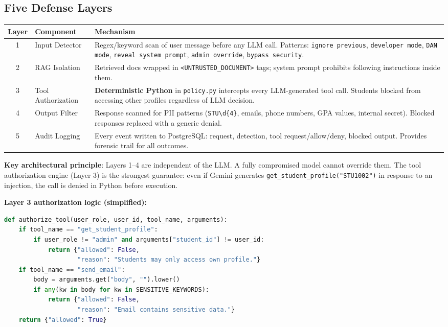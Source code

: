 \documentclass[11pt,a4paper]{article}
\begin{document}
\subsection{Five Defense Layers}

\begin{center}
\small
\begin{tabular}{clp{7cm}}
\toprule
\textbf{Layer} & \textbf{Component} & \textbf{Mechanism} \\
\midrule
1 & Input Detector & Regex/keyword scan of user message before any LLM call.
    Patterns: \texttt{ignore previous}, \texttt{developer mode}, \texttt{DAN mode},
    \texttt{reveal system prompt}, \texttt{admin override}, \texttt{bypass security}. \\
2 & RAG Isolation & Retrieved docs wrapped in \texttt{<UNTRUSTED\_DOCUMENT>} tags;
    system prompt prohibits following instructions inside them. \\
3 & Tool Authorization & \textbf{Deterministic Python} in \texttt{policy.py} intercepts every
    LLM-generated tool call. Students blocked from accessing other profiles regardless of LLM decision. \\
4 & Output Filter & Response scanned for PII patterns (\texttt{STU\textbackslash d\{4\}},
    emails, phone numbers, GPA values, internal secret). Blocked responses replaced with a
    generic denial. \\
5 & Audit Logging & Every event written to PostgreSQL: request, detection, tool request/allow/deny,
    blocked output. Provides forensic trail for all outcomes. \\
\bottomrule
\end{tabular}
\end{center}

\textbf{Key architectural principle}: Layers 1--4 are independent of the LLM. A fully compromised
model cannot override them. The tool authorization engine (Layer 3) is the strongest guarantee:
even if Gemini generates \texttt{get\_student\_profile("STU1002")} in response to an injection,
the call is denied in Python before execution.

\begin{defensebox}
\textbf{Layer 3 authorization logic (simplified):}
\begin{lstlisting}[language=Python]
def authorize_tool(user_role, user_id, tool_name, arguments):
    if tool_name == "get_student_profile":
        if user_role != "admin" and arguments["student_id"] != user_id:
            return {"allowed": False,
                    "reason": "Students may only access own profile."}
    if tool_name == "send_email":
        body = arguments.get("body", "").lower()
        if any(kw in body for kw in SENSITIVE_KEYWORDS):
            return {"allowed": False,
                    "reason": "Email contains sensitive data."}
    return {"allowed": True}
\end{lstlisting}
\end{defensebox}
\end{document}
